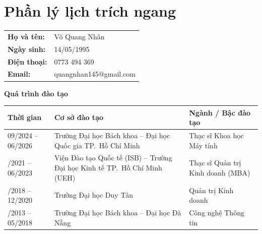 \cleardoublepage
{}
{}
\chapter*{Phần lý lịch trích ngang}

\renewcommand{\arraystretch}{1.05}

\newcommand{\llheading}[1]{%
  \par\vspace{1em}%
  \begingroup\setstretch{1}\raggedright\noindent
  \Huge\bfseries #1\par
  \endgroup
  \nobreak\vspace{0.3em}\nobreak}

\vspace{-3.5em}

\noindent
\begin{tabular}{@{}p{4.2cm}p{10cm}@{}}
\textbf{Họ và tên:} & Võ Quang Nhân \\[0.2em]
\textbf{Ngày sinh:} & 14/05/1995 \\[0.2em]
\textbf{Điện thoại:} & 0773 494 369 \\[0.2em]
\textbf{Email:} & quangnhan145@gmail.com \\
\end{tabular}

\llheading{Quá trình đào tạo}

\noindent\small
\begin{tabular}{@{}p{3.4cm}>{\raggedright\arraybackslash}p{5.9cm}>{\raggedright\arraybackslash}p{4.5cm}@{}}
\toprule
\textbf{Thời gian} & \textbf{Cơ sở đào tạo} & \textbf{Ngành / Bậc đào tạo} \\
\midrule
09/2024 -- 06/2026 & Trường Đại học Bách khoa -- Đại học Quốc gia TP.\ Hồ Chí Minh & Thạc sĩ Khoa học Máy tính \\
\addlinespace
06/2021 -- 06/2023 & Viện Đào tạo Quốc tế (ISB) -- Trường Đại học Kinh tế TP.\ Hồ Chí Minh (UEH) & Thạc sĩ Quản trị Kinh doanh (MBA)\\
\addlinespace
06/2018 -- 12/2020 & Trường Đại học Duy Tân & Quản trị Kinh doanh\\
\addlinespace
10/2013 -- 05/2018 & Trường Đại học Bách khoa -- Đại học Đà Nẵng & Công nghệ Thông tin\\
\bottomrule
\end{tabular}


